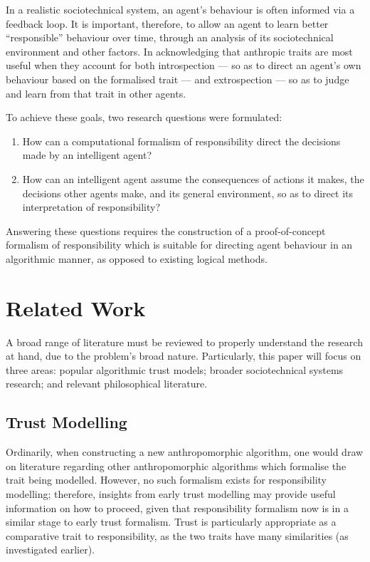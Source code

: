In a realistic sociotechnical system, an agent's behaviour is often informed via a feedback loop. It is important, therefore, to allow an agent to learn better ``responsible'' behaviour over time, through an analysis of its sociotechnical environment and other factors. In acknowledging that anthropic traits are most useful when they account for both introspection --- so as to direct an agent's own behaviour based on the formalised trait --- and extrospection --- so as to judge and learn from that trait in other agents.\par

To achieve these goals, two research questions were formulated:

\begin{enumerate}\label{RQ}
    \item How can a computational formalism of responsibility direct the decisions made by an intelligent agent?
    \item How can an intelligent agent assume the consequences of actions it makes, the decisions other agents make, and its general environment, so as to direct its interpretation of responsibility?
\end{enumerate}\par

Answering these questions requires the construction of a proof-of-concept formalism of responsibility which is suitable for directing agent behaviour in an algorithmic manner, as opposed to existing logical methods.

\section{Related Work}\label{sec:related_work}
A broad range of literature must be reviewed to properly understand the research at hand, due to the problem's broad nature. Particularly, this paper will focus on three areas: popular algorithmic trust models; broader sociotechnical systems research; and relevant philosophical literature.\par

\subsection{Trust Modelling}
Ordinarily, when constructing a new anthropomorphic algorithm, one would draw on literature regarding other anthropomorphic algorithms which formalise the trait being modelled. However, no such formalism exists for responsibility modelling; therefore, insights from early trust modelling may provide useful information on how to proceed, given that responsibility formalism now is in a similar stage to early trust formalism. Trust is particularly appropriate as a comparative trait to responsibility, as the two traits have many similarities (as investigated earlier).\par

